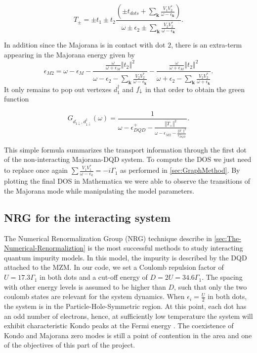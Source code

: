 \begin{equation}
    T_{\pm}=\pm t_{1}\pm t_{2}\frac{\left(\pm t_{dots}+\sum_{\mathbf{k}}\frac{V_{1}V_{2}^{*}}{\omega-\epsilon_{\mathbf{k}}}\right)}{\omega\pm\epsilon_{2}\pm\sum_{\mathbf{k}}\frac{V_{2}V_{2}^{*}}{\omega-\epsilon_{\mathbf{k}}}}. \label{eq:T+-}
\end{equation}

In addition since the Majorana is in contact with dot $2$, there is an extra-term appearing in the  Majorana energy given by 
\begin{equation}
    \epsilon_{M2}=\omega-\epsilon_{M}-\frac{\frac{\omega}{\omega+\epsilon_{M}}\left\Vert t_{2}\right\Vert ^{2} } {\omega-\epsilon_{2}-\sum_{\mathbf{k}}\frac{V_{2}V_{2}^{*}}{\omega-\epsilon_{\mathbf{k}}}}-\frac{\frac{\omega}{\omega+\epsilon_{M}}\left\Vert t_{2}\right\Vert ^{2}}{\omega+\epsilon_{2}-\sum_{\mathbf{k}}\frac{V_{2}V_{2}^{*}}{\omega+\epsilon_{\mathbf{k}}}}. \label{eq:M2}
\end{equation}
It only remains to pop out vertexes $d^\dagger_1$ and $f_\downarrow$ in that order to obtain the green function 

\begin{equation}
    G_{{d_{1\downarrow},d_{1\downarrow}^{\dagger}}}\left(\omega\right)=\frac{1}{\omega-\epsilon_{DQD}^{+}-\frac{\left\Vert T_{+}\right\Vert ^{2}}{\omega-\epsilon_{M2}-\frac{\left\Vert T_{-}\right\Vert ^{2}}{\epsilon_{DQD}^{-}}}}.
    \label{eq:Green_NonInteracting}
\end{equation}

This simple formula summarizes the transport information through the first dot of the non-interacting Majorana-DQD system.  To compute the DOS we just need to replace once again  $\sum \frac{V_1V^*_1}{\omega -\epsilon_k}= -i\Gamma_1$ as performed in \ref{sec:GraphMethod}. By plotting the final DOS in Mathematica we were able to observe the transitions of the Majorana mode while manipulating the model parameters.  


\subsection{NRG for the interacting system}

The Numerical Renormalization Group (NRG) technique describe in \ref{sec:The-Numerical-Renormaliztion} is the most successful methods to study interacting quantum impurity models. In this model, the impurity is described by the DQD attached to the MZM. In our code, we set a Coulomb repulsion factor of $U =17.3\Gamma_1$ in both dots and a cut-off energy of $D=2U=34.6\Gamma_1$. The spacing with other energy levels is assumed to be higher than $D$, such that only the two coulomb states are relevant for the system dynamics.  When  $\epsilon_i = \frac{U}{2}$ in both dots, the system is in the Particle-Hole-Symmetric region. At this point, each dot has an odd number of electrons, hence, at sufficiently low temperature the system will exhibit characteristic Kondo peaks at the Fermi energy \citet{wilson_renormalization_1975}. The coexistence of Kondo and Majorana zero modes is still a point of contention in the area and one of the objectives of this part of the project.



